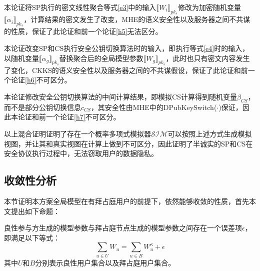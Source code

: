 \begin{hybrid}\label{h6}
	本论证将SP执行的密文线性聚合等式\ref{e3}中的输入$\llbracket W_i\rrbracket_{pk_s}$修改为加密随机变量$\llbracket \alpha_i\rrbracket_{pk_s}$，计算结果的密文发生了改变，MHE的语义安全性以及服务器之间不共谋的性质，保证了此论证和前一个论证\ref{h5}无法区分。
\end{hybrid}

\begin{hybrid}\label{h7}
	本论证改变SP和CS执行安全公钥切换算法时的输入，即执行等式\ref{e4}时的输入，以随机变量$\llbracket \alpha_g\rrbracket_{pk_s}$替换聚合后的全局模型参数$\llbracket W_g\rrbracket_{pk_s}$，此时也只有密文内容发生了变化，CKKS的语义安全性以及服务器之间的不共谋假设，保证了此论证和前一个论证\ref{h6}不可区分。
\end{hybrid}

\begin{hybrid}\label{h8}
	本论证修改安全公钥切换算法的中间计算结果，即模拟CS计算得到随机变量$\beta_{CS}$，而不是部分公钥切换信息$c_{CS}$，其安全性由MHE中的DPubKeySwitch($\cdot$)保证，因此本论证和前一个论证\ref{h7}不可区分。
\end{hybrid}

以上混合证明证明了存在一个概率多项式模拟器$ \mathcal{SIM} $可以按照上述方式生成模拟视图，并让其和真实视图在计算上做到不可区分，因此证明了半诚实的SP和CS在安全协议执行过程中，无法窃取用户的数据隐私。


\subsection{收敛性分析}
本节证明本方案全局模型在有拜占庭用户的前提下，依然能够收敛的性质，首先本文提出如下命题：
\begin{proposition}[误差项]\label{pro2}
	良性参与方生成的模型参数与拜占庭节点生成的模型参数之间存在一个误差项$\epsilon$，即满足以下等式：
	$$
		\sum_{u\in U}W_u=   \sum_{u\in B}W_u^{\kappa} + \epsilon	
	$$
	其中$U$和$ B $分别表示良性用户集合以及拜占庭用户集合。
\end{proposition}

